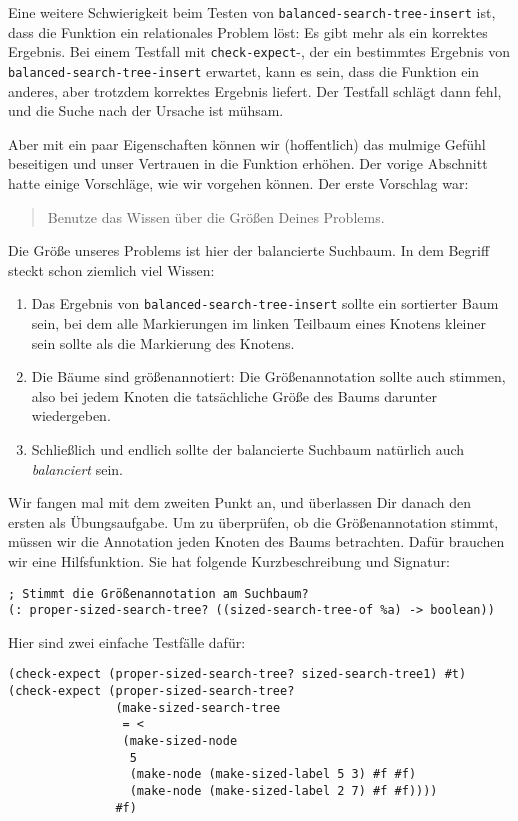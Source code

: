 Eine weitere Schwierigkeit beim Testen von
\lstinline{balanced-search-tree-insert} ist, dass die Funktion ein
relationales Problem löst: Es gibt mehr als ein korrektes
Ergebnis. Bei einem Testfall mit \lstinline{check-expect}-,
der ein bestimmtes Ergebnis von 
\lstinline{balanced-search-tree-insert} erwartet, kann es sein, dass
die Funktion ein anderes, aber trotzdem korrektes Ergebnis liefert.
Der Testfall schlägt dann fehl, und die Suche nach der Ursache ist
mühsam.

Aber mit ein paar Eigenschaften können wir (hoffentlich) das mulmige
Gefühl beseitigen und unser Vertrauen in die Funktion erhöhen.  Der
vorige Abschnitt hatte einige Vorschläge, wie wir vorgehen können.
Der erste Vorschlag war:
%
\begin{quote}
  Benutze das Wissen über die Größen Deines Problems.
\end{quote}
%
Die Größe unseres Problems ist hier der balancierte Suchbaum.  In dem
Begriff steckt schon ziemlich viel Wissen:
%
\begin{enumerate}
\item Das Ergebnis von \lstinline{balanced-search-tree-insert} sollte ein
  sortierter Baum sein, bei dem alle Markierungen im linken Teilbaum
  eines Knotens kleiner sein sollte als die Markierung des Knotens.
\item Die Bäume sind größenannotiert: Die Größenannotation sollte auch
  stimmen, also bei jedem Knoten die tatsächliche Größe des Baums
  darunter wiedergeben.
\item Schließlich und endlich sollte der balancierte Suchbaum
  natürlich auch \emph{balanciert} sein.
\end{enumerate}
%
Wir fangen mal mit dem zweiten Punkt an, und überlassen Dir danach den
ersten als Übungsaufgabe.  Um zu überprüfen, ob die Größenannotation
stimmt, müssen wir die Annotation jeden Knoten des Baums betrachten.
Dafür brauchen wir eine Hilfsfunktion.  Sie hat folgende
Kurzbeschreibung und Signatur:
%
\begin{lstlisting}
; Stimmt die Größenannotation am Suchbaum?
(: proper-sized-search-tree? ((sized-search-tree-of %a) -> boolean))
\end{lstlisting}
%
Hier sind zwei einfache Testfälle dafür:
%
\begin{lstlisting}
(check-expect (proper-sized-search-tree? sized-search-tree1) #t)
(check-expect (proper-sized-search-tree?
               (make-sized-search-tree
                = <
                (make-sized-node
                 5
                 (make-node (make-sized-label 5 3) #f #f)
                 (make-node (make-sized-label 2 7) #f #f))))
               #f)
\end{lstlisting}              
